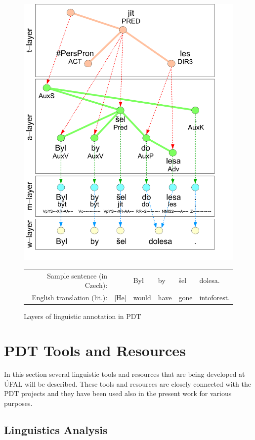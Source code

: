 \begin{figure}
	\begin{center}
	\includegraphics[width=0.6\hsize]{PDT_layers}
		\begin{tabular}{rlllll}
Sample sentence (in Czech): & & Byl & by & šel & dolesa.\\
English translation (lit.):& [He] & would & have & gone & intoforest.			
		\end{tabular}
	\end{center}
\caption{Layers of linguistic annotation in PDT}
\label{fig:third_layers}
\end{figure}





\section{PDT Tools and Resources} \label{sec:third_pdt_tools_and_resources}

In this section several linguistic tools and resources that are being developed at ÚFAL will be described. These tools and resources are closely connected with the PDT projects and they have been used also in the present work for various purposes.


\subsection{Linguistics Analysis} \label{sec:third_ling_tools}

